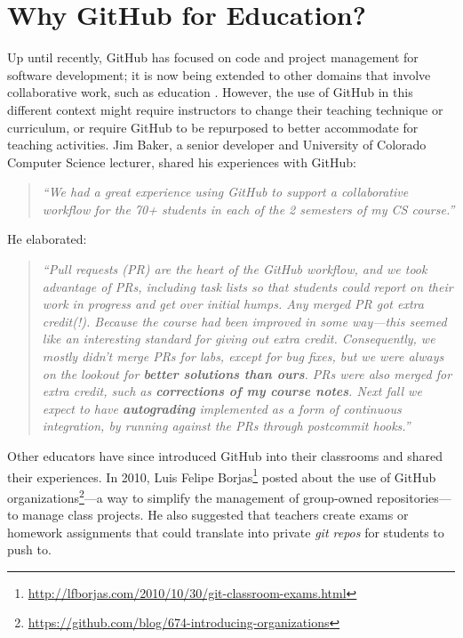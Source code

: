 \section{Why GitHub for Education?}
Up until recently, GitHub has focused on code and project management for software development; it is now being extended to other domains that involve collaborative work, such as education \cite{Griffin:2013:GCJ:2458539.2458551}. However, the use of GitHub in this different context might require instructors to change their teaching technique or curriculum, or require GitHub to be repurposed to better accommodate for teaching activities. Jim Baker, a senior developer and University of Colorado Computer Science lecturer, shared his experiences with GitHub: \begin{quote}\textit{``We had a great experience using GitHub to support a collaborative workflow for the 70+ students in each of the 2 semesters of my CS course.''}\end{quote} He elaborated: \begin{quote}\textit{``Pull requests (PR) are the heart of the GitHub workflow, and we took advantage of PRs, including task lists so that students could report on their work in progress and get over initial humps. Any merged PR got extra credit(!). Because the course had been improved in some way---this seemed like an interesting standard for giving out extra credit. Consequently, we mostly didn't merge PRs for labs, except for bug fixes, but we were always on the lookout for \textbf{better solutions than ours}. PRs were also merged for extra credit, such as \textbf{corrections of my course notes}. Next fall we expect to have \textbf{autograding} implemented as a form of continuous integration, by running against the PRs through postcommit hooks.''}\end{quote}

Other educators have since introduced GitHub into their classrooms and shared their experiences. In 2010, Luis Felipe Borjas\footnote{\url{http://lfborjas.com/2010/10/30/git-classroom-exams.html}} posted about the use of GitHub organizations\footnote{\url{https://github.com/blog/674-introducing-organizations}}---a way to simplify the management of group-owned repositories---to manage class projects. He also suggested that teachers create exams or homework assignments that could translate into private \textit{git repos} for students to push to.

